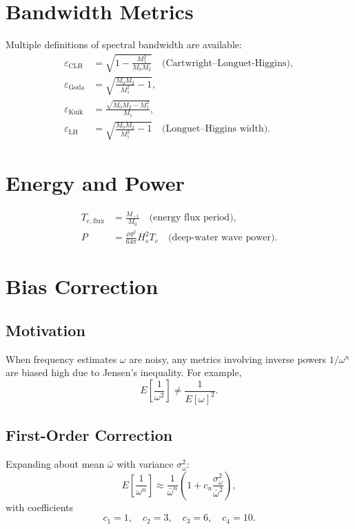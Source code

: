 \documentclass[11pt]{article}
\begin{document}
\section{Bandwidth Metrics}

Multiple definitions of spectral bandwidth are available:
\begin{align}
\varepsilon_{\text{CLH}} &= \sqrt{1 - \tfrac{M_1^2}{M_0 M_2}} \quad \text{(Cartwright–Longuet-Higgins)}, \\
\varepsilon_{\text{Goda}} &= \sqrt{\tfrac{M_0 M_2}{M_1^2} - 1}, \\
\varepsilon_{\text{Kuik}} &= \frac{\sqrt{M_0 M_2 - M_1^2}}{M_1}, \\
\varepsilon_{\text{LH}} &= \sqrt{\tfrac{M_0 M_2}{M_1^2} - 1} \quad \text{(Longuet–Higgins width)}.
\end{align}

\section{Energy and Power}

\begin{align}
T_{e,\text{flux}} &= \frac{M_{-1}}{M_0} \quad \text{(energy flux period)}, \\
P &= \frac{\rho g^2}{64\pi} H_s^2 T_e \quad \text{(deep-water wave power)}.
\end{align}

\section{Bias Correction}

\subsection{Motivation}

When frequency estimates $\omega$ are noisy, any metrics involving inverse powers $1/\omega^n$ are biased high due to Jensen’s inequality.  
For example,
\[
E\!\left[\frac{1}{\omega^2}\right] \neq \frac{1}{E[\omega]^2}.
\]

\subsection{First-Order Correction}

Expanding about mean $\bar{\omega}$ with variance $\sigma_\omega^2$:
\[
E\!\left[\frac{1}{\omega^n}\right] \approx \frac{1}{\bar{\omega}^n}
\left(1 + c_n \frac{\sigma_\omega^2}{\bar{\omega}^2}\right),
\]
with coefficients
\[
c_1 = 1,\quad c_2 = 3,\quad c_3 = 6,\quad c_4 = 10.
\]
\end{document}

